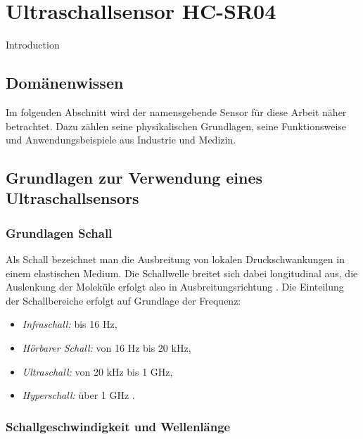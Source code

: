 %
%
%

\chapter{Ultraschallsensor HC-SR04}


Introduction

\section{Domänenwissen}
Im folgenden Abschnitt wird der namensgebende Sensor für diese Arbeit näher betrachtet. Dazu zählen seine physikalischen Grundlagen, seine Funktionsweise und Anwendungsbeispiele aus Industrie und Medizin.

\section{Grundlagen zur Verwendung eines Ultraschallsensors}

\subsection{Grundlagen Schall}

Als Schall bezeichnet man die Ausbreitung von lokalen Druckschwankungen in einem elastischen Medium. Die Schallwelle breitet sich dabei longitudinal aus, die Auslenkung der Moleküle erfolgt also in Ausbreitungsrichtung \cite{Tippler:2024}.
Die Einteilung der Schallbereiche erfolgt auf Grundlage der Frequenz:

\begin{itemize}
    \item \textit{Infraschall:} bis 16 Hz,
    \item \textit{Hörbarer Schall:} von 16 Hz bis 20 kHz,
    \item \textit{Ultraschall:} von 20 kHz bis 1 GHz,
    \item \textit{Hyperschall:} über 1 GHz \cite{Hering:2023}.
\end{itemize}



\subsection{Schallgeschwindigkeit und Wellenlänge}\label{AbschnittVschall}

